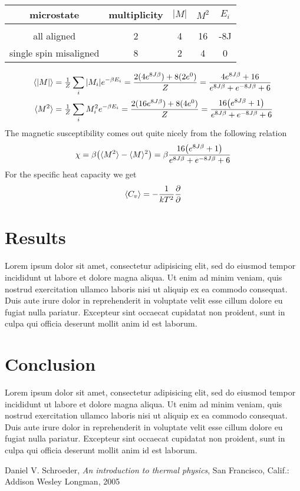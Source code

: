 \documentclass[a4paper, 12pt]{article}
\newcommand{\expect}[1]{\langle #1 \rangle}
\begin{document}
	\begin{center}
	\begin{tabular}{c c c c c}
		microstate	&	multiplicity	&	$|M|$	&	$M^2$ 	&	$E_i$\\
		\hline \\
		all aligned	&	2	&	4	&	16	&	-8J\\
		single spin misaligned & 8	&	2	&	4	&	0
	\end{tabular}
	\end{center}

	\begin{align*}
		\langle \abs{M} \rangle & = \tfrac{1}{Z} \sum_{i}\abs{M_i}e^{-\beta E_i} = \frac{2(4e^{8J\beta}) + 8(2e^{0})}{Z} = 
		\frac{4e^{8J\beta}+16}{e^{8J\beta}+e^{-8J\beta}+6}\\
		\langle M^2 \rangle & = \tfrac{1}{Z} \sum_{i}M_i^2e^{-\beta E_i} = \frac{2(16e^{8J\beta}) + 8(4e^{0})}{Z} = 
		\frac{16\qty(e^{8J\beta}+1)}{e^{8J\beta}+e^{-8J\beta}+6}\\
	\end{align*}
	The magnetic susceptibility comes out quite nicely from the following relation
	\begin{equation*}
		\chi = \beta \qty( \expect{M^2} - \expect{M}^2 ) = \beta \frac{16\qty(e^{8J\beta}+1)}{e^{8J\beta}+e^{-8J\beta}+6}
	\end{equation*}
	For the specific heat capacity we get
	\begin{equation}
		\expect{C_v} = -\frac{1}{kT^2}\pdv{}
	\end{equation}

	\newpage
\subsection{}
\section{Results}
	Lorem ipsum dolor sit amet, consectetur adipisicing elit, sed do eiusmod
	tempor incididunt ut labore et dolore magna aliqua. Ut enim ad minim veniam,
	quis nostrud exercitation ullamco laboris nisi ut aliquip ex ea commodo
	consequat. Duis aute irure dolor in reprehenderit in voluptate velit esse
	cillum dolore eu fugiat nulla pariatur. Excepteur sint occaecat cupidatat non
	proident, sunt in culpa qui officia deserunt mollit anim id est laborum.

	\newpage

\section{Conclusion}
	Lorem ipsum dolor sit amet, consectetur adipisicing elit, sed do eiusmod
	tempor incididunt ut labore et dolore magna aliqua. Ut enim ad minim veniam,
	quis nostrud exercitation ullamco laboris nisi ut aliquip ex ea commodo
	consequat. Duis aute irure dolor in reprehenderit in voluptate velit esse
	cillum dolore eu fugiat nulla pariatur. Excepteur sint occaecat cupidatat non
	proident, sunt in culpa qui officia deserunt mollit anim id est laborum.

\begin{thebibliography}{9}
	Daniel V. Schroeder,
	\textit{An introduction to thermal physics},
	San Francisco, Calif.: Addison Wesley Longman,
	2005
\end{thebibliography}
\end{document}
